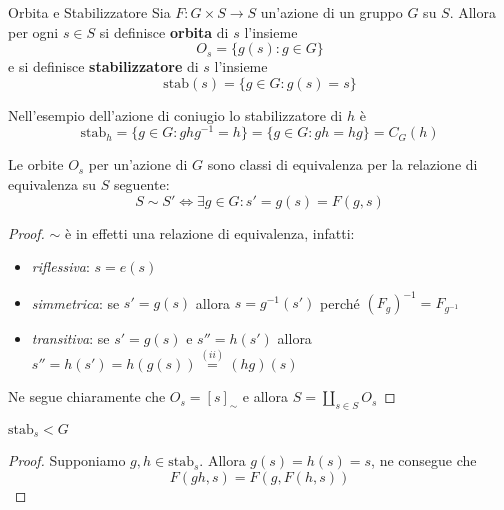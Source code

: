 \begin{definition}{Orbita e Stabilizzatore}
    Sia \(F : G \times  S \to S\) un'azione di un gruppo \(G\) su \(S\). Allora
    per ogni \(s \in S\) si definisce \textbf{orbita} di \(s\) l'insieme
    \[
        O_s = \{g{(s)} : g \in G\}
    \]
    e si definisce \textbf{stabilizzatore} di \(s\) l'insieme
    \[
        \text{stab}{(s)} = \{g \in G : g{(s)} = s\}
    \]
\end{definition}
\begin{example}
    Nell'esempio dell'azione di coniugio lo stabilizzatore di \(h\) è
    \[
        \text{stab}_h = \{g \in G : ghg^{-1} = h\} = \{g \in G : gh = hg\} =
        C_G{(h)}
    \]
\end{example}

\begin{proposition}

Le orbite \(O_s\) per un'azione di \(G\) sono classi di equivalenza per la
relazione di equivalenza su \(S\) seguente:
\[
  S \sim S' \iff \exists g \in G : s' = g{(s)} = F{(g, s)}
\]
\end{proposition}
\begin{proof}
\(\sim\) è in effetti una relazione di equivalenza, infatti:
\begin{itemize}[label = --]
    \item \emph{riflessiva}: \(s = e{(s)}\)
    \item \emph{simmetrica}: se \(s' = g{(s)}\) allora \(s = g^{-1}{(s')}\)
        perché \({(F_g)}^{-1} = F_{g^{-1}} \) 
    \item \emph{transitiva}: se \(s' = g{(s)}\) e \(s'' = h{(s')}\) allora
        \(s'' = h{(s')} = h{(g{(s)})} \overset{(ii)}{=} {(hg)}{(s)}\)
\end{itemize}

Ne segue chiaramente che \(O_s = {[s]}_\sim \) e allora \(\displaystyle S = \coprod_{s \in S}
O_s\) 
\end{proof}
\begin{proposition}
    \(\text{stab}_s < G\) 
\end{proposition}
\begin{proof}
    Supponiamo \(g, h \in \text{stab}_s\). Allora \(g{(s)} = h{(s)} = s\), ne
    consegue che
    \[
      F{(gh, s)} = F{(g, F{(h, s)})} 
    \]
\end{proof}





